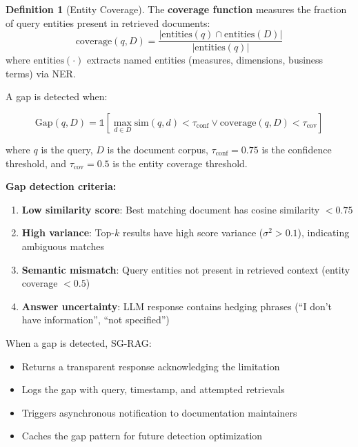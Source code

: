 \documentclass[11pt,a4paper]{article}
\theoremstyle{definition}
\newtheorem{definition}{Definition}[section]
\theoremstyle{remark}
\newcommand{\sgrag}{\textsc{SG-RAG}\xspace}
\begin{document}
\begin{definition}[Entity Coverage]
\label{def:entity-coverage}
The \textbf{coverage function} measures the fraction of query entities present in retrieved documents:
\begin{equation}
\text{coverage}(q, D) = \frac{|\text{entities}(q) \cap \text{entities}(D)|}{|\text{entities}(q)|}
\end{equation}
where $\text{entities}(\cdot)$ extracts named entities (measures, dimensions, business terms) via NER.
\end{definition}

A gap is detected when:

\begin{equation}
\text{Gap}(q, D) = \mathbb{1}\left[\max_{d \in D} \text{sim}(q, d) < \tau_{\text{conf}} \lor \text{coverage}(q, D) < \tau_{\text{cov}}\right]
\end{equation}

where $q$ is the query, $D$ is the document corpus, $\tau_{\text{conf}} = 0.75$ is the confidence threshold, and $\tau_{\text{cov}} = 0.5$ is the entity coverage threshold.

\textbf{Gap detection criteria:}
\begin{enumerate}
    \item \textbf{Low similarity score}: Best matching document has cosine similarity $< 0.75$
    \item \textbf{High variance}: Top-$k$ results have high score variance ($\sigma^2 > 0.1$), indicating ambiguous matches
    \item \textbf{Semantic mismatch}: Query entities not present in retrieved context (entity coverage $< 0.5$)
    \item \textbf{Answer uncertainty}: LLM response contains hedging phrases (``I don't have information'', ``not specified'')
\end{enumerate}

When a gap is detected, \sgrag:
\begin{itemize}
    \item Returns a transparent response acknowledging the limitation
    \item Logs the gap with query, timestamp, and attempted retrievals
    \item Triggers asynchronous notification to documentation maintainers
    \item Caches the gap pattern for future detection optimization
\end{itemize}
\end{document}
